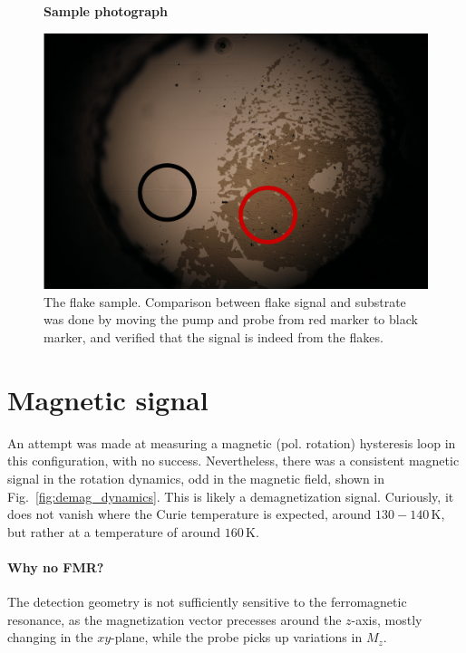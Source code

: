 \documentclass[nobib]{tufte-handout}
\begin{document}
\begin{figure}
	\centering
	\textbf{Sample photograph}\par\medskip
	\includegraphics[width=0.8\linewidth]{Graphics/sample_photo_marked.png}
	\caption{The  flake sample. Comparison between flake signal and substrate was done by moving the pump and probe from red marker to black marker, and verified that the signal is indeed from the flakes.}
	\label{fig:photomarked}
\end{figure}

\section{Magnetic signal}
An attempt was made at measuring a magnetic (pol. rotation) hysteresis loop in this configuration, with no success. Nevertheless, there was a consistent magnetic signal in the rotation dynamics, odd in the magnetic field, shown in Fig.~\ref{fig:demag_dynamics}. This is likely a demagnetization signal. Curiously, it does not vanish where the Curie temperature is expected, around \( 130-140\,\mathrm{K} \), but rather at a temperature of around \( 160\,\mathrm{K} \).

\paragraph{Why no FMR?} The detection geometry is not sufficiently sensitive to the ferromagnetic resonance, as the magnetization vector precesses around the \(z\)-axis, mostly changing in the \( xy \)-plane, while the probe picks up variations in \( M_z \).
\end{document}
